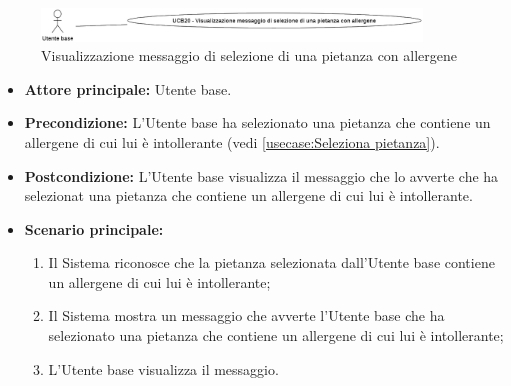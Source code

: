 \label{usecase:Visualizzazione messaggio di selezione di una pietanza con allergene}

\begin{figure}[h]
	\centering
	\includegraphics[width=0.9\textwidth]{./uml/UCB20.png} 
	\caption{Visualizzazione messaggio di selezione di una pietanza con allergene}
	\label{fig:UCB20}
  \end{figure}

\begin{itemize}
	\item \textbf{Attore principale:} Utente base.

	\item \textbf{Precondizione:}
	      L'Utente base ha selezionato una pietanza che contiene un allergene di cui lui è intollerante (vedi \autoref{usecase:Seleziona pietanza}).

	\item \textbf{Postcondizione:}
	      L'Utente base visualizza il messaggio che lo avverte che ha selezionat una pietanza che contiene un allergene di cui lui è intollerante.

	\item \textbf{Scenario principale:}
	      \begin{enumerate}
		      \item Il Sistema riconosce che la pietanza selezionata dall'Utente base contiene un allergene di cui lui è intollerante;
		      \item Il Sistema mostra un messaggio che avverte l'Utente base che ha selezionato una pietanza che contiene un allergene di cui lui è intollerante;
		      \item L'Utente base visualizza il messaggio.
	      \end{enumerate}
\end{itemize}
